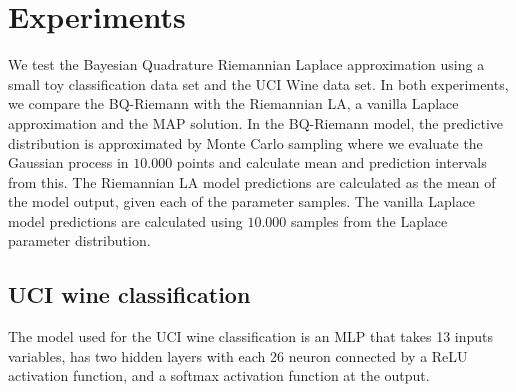 \section{Experiments}
We test the Bayesian Quadrature Riemannian Laplace approximation using a small toy classification data set and the UCI Wine data set\cite{wine_quality_186}. 
In both experiments, we compare the BQ-Riemann with the Riemannian LA, a vanilla Laplace approximation and the MAP solution. 
In the BQ-Riemann model, the predictive distribution is approximated by Monte Carlo sampling where we evaluate the Gaussian process in $10.000$ points and calculate mean and prediction intervals from this. The Riemannian LA model predictions are calculated as the mean of the model output, given each of the parameter samples. The vanilla Laplace model predictions are calculated using $10.000$ samples from the Laplace parameter distribution.

\subsection{UCI wine classification}
The model used for the UCI wine classification is an MLP that takes 13 inputs variables, has two hidden layers with each 26 neuron connected by a ReLU activation function, and a softmax activation function at the output.


